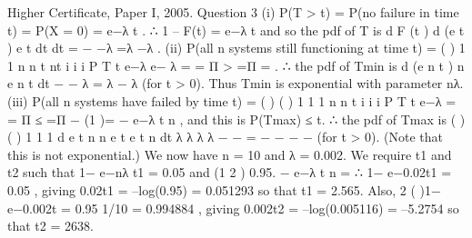 \documentclass[a4paper,12pt]{article}
\begin{document}
Higher Certificate, Paper I, 2005. Question 3
(i) P(T > t) = P(no failure in time t) = P(X = 0) = e−λ t .
∴ 1 – F(t) = e−λ t and so the pdf of T is d F (t ) d (e t ) e t
dt dt
= − −λ =λ −λ .
(ii) P(all n systems still functioning at time t) = ( )
1 1
n n
t nt
i
i i
P T t e−λ e− λ
= =
Π > =Π = .
∴ the pdf of Tmin is d (e n t ) n e n t
dt
− − λ = λ − λ (for t > 0).
Thus Tmin is exponential with parameter nλ.
(iii) P(all n systems have failed by time t) = ( ) ( )
1 1
1
n n
t
i
i i
P T t e−λ
= =
Π ≤ =Π −
(1 )= − e−λ t n , and this is P(Tmax) ≤ t.
∴ the pdf of Tmax is {( ) } ( ) 1 1 1 d e t n n e t e t n
dt
λ λ λ λ − − = − − − − (for t > 0).
(Note that this is not exponential.)
We now have n = 10 and λ = 0.002. We require t1 and t2 such that 1− e−nλ t1 = 0.05
and (1 2 ) 0.95. − e−λ t n =
∴ 1− e−0.02t1 = 0.05 , giving 0.02t1 = –log(0.95) = 0.051293 so that t1 = 2.565.
Also, 2 ( )1− e−0.002t = 0.95 1/10 = 0.994884 , giving 0.002t2 = –log(0.005116) = –5.2754
so that t2 = 2638.
\end{document}
